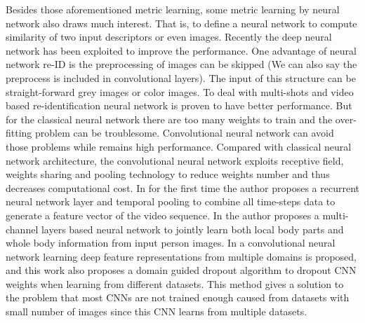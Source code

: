 Besides those aforementioned metric learning, some metric learning by neural network also draws much interest. That is, to define a neural network to compute similarity of two input descriptors or even images. Recently the deep neural network has been exploited to improve the performance. One advantage of neural network re-ID is the preprocessing of images can be skipped (We can also say the preprocess is included in convolutional layers). The input of this structure can be straight-forward grey images or color images. To deal with multi-shots and video based re-identification neural network is proven to have better performance. But for the classical neural network there are too many weights to train and the over-fitting problem can be troublesome. Convolutional neural network can avoid those problems while remains high performance. Compared with classical neural network architecture, the convolutional neural network exploits receptive field, weights sharing and pooling technology to reduce weights number and thus decreases computational cost. In \cite{RecurrentCNN} for the first time the author proposes a recurrent neural network layer and temporal pooling to combine all time-steps data to generate a feature vector of the video sequence. In \cite{MultiCNN} the author proposes a multi-channel layers based neural network to jointly learn both local body parts and whole body information from input person images.  In \cite{DeepfeatureCNN} a convolutional neural network learning deep feature representations from multiple domains is proposed, and this work also proposes a domain guided dropout algorithm to dropout CNN weights when learning from different datasets. This method gives a solution to the problem that most CNNs are not trained enough caused from datasets with small number of images since this CNN learns from multiple datasets.